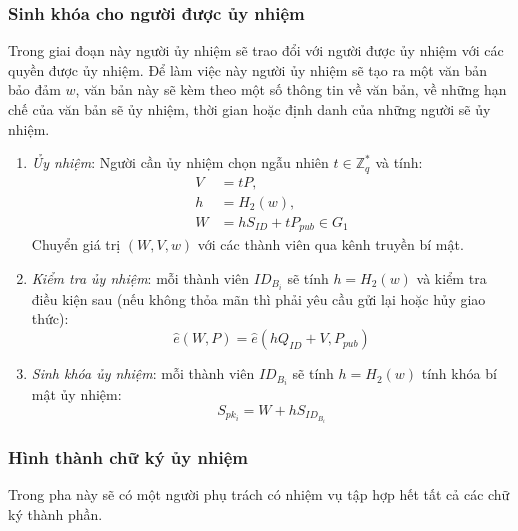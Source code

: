 \subsubsection{Sinh khóa cho người được ủy nhiệm}

Trong giai đoạn này người ủy nhiệm sẽ trao đổi với người được ủy nhiệm với các quyền được ủy nhiệm. Để làm việc này người ủy nhiệm sẽ tạo ra một văn bản bảo đảm $w$, văn bản này sẽ kèm theo một số thông tin về văn bản, về những hạn chế của văn bản sẽ ủy nhiệm, thời gian hoặc định danh của những người sẽ ủy nhiệm.
\begin{enumerate}[label=(\arabic*)]
	\item \textit{Ủy nhiệm}: Người cần ủy nhiệm chọn ngẫu nhiên $t \in \mathbb{Z}_q^*$ và tính:
	\begin{align*}
	V &= tP, \\
	h &=H_2(w), \\
	W &= hS_{ID} + tP_{pub} \in G_1
	\end{align*}
	Chuyển giá trị $(W, V, w)$ với các thành viên qua kênh truyền bí mật.
	\item \textit{Kiểm tra ủy nhiệm}: mỗi thành viên $ID_{B_i}$ sẽ tính $ h =H_2(w) $ và kiểm tra điều kiện sau (nếu không thỏa mãn thì phải yêu cầu gửi lại hoặc hủy giao thức):
	\begin{equation*}
	\hat{e}(W,P) = \hat{e}(hQ_{ID} + V,P_{pub})
	\end{equation*}
	\item \textit{Sinh khóa ủy nhiệm}: mỗi thành viên $ID_{B_i}$ sẽ tính $ h =H_2(w) $ tính khóa bí mật ủy nhiệm:
	\begin{equation*}
	S_{pk_i} = W + hS_{ID_{B_i}}
	\end{equation*}
\end{enumerate}

\subsubsection{Hình thành chữ ký ủy nhiệm}
Trong pha này sẽ có một người phụ trách có nhiệm vụ tập hợp hết tất cả các chữ ký thành phần.


